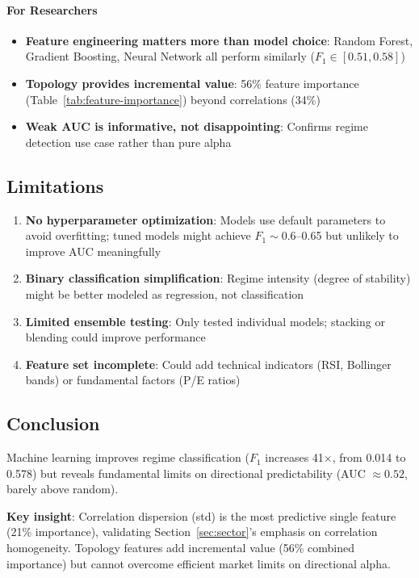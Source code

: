 \paragraph{For Researchers}
\begin{itemize}
    \item \textbf{Feature engineering matters more than model choice}: Random Forest, Gradient Boosting, Neural Network all perform similarly ($F_1 \in [0.51, 0.58]$)
    \item \textbf{Topology provides incremental value}: 56\% feature importance (Table~\ref{tab:feature-importance}) beyond correlations (34\%)
    \item \textbf{Weak AUC is informative, not disappointing}: Confirms regime detection use case rather than pure alpha
\end{itemize}

\subsection{Limitations}

\begin{enumerate}
    \item \textbf{No hyperparameter optimization}: Models use default parameters to avoid overfitting; tuned models might achieve $F_1 \sim 0.6$--0.65 but unlikely to improve AUC meaningfully
    \item \textbf{Binary classification simplification}: Regime intensity (degree of stability) might be better modeled as regression, not classification
    \item \textbf{Limited ensemble testing}: Only tested individual models; stacking or blending could improve performance
    \item \textbf{Feature set incomplete}: Could add technical indicators (RSI, Bollinger bands) or fundamental factors (P/E ratios)
\end{enumerate}

\subsection{Conclusion}

Machine learning improves regime classification ($F_1$ increases 41$\times$, from 0.014 to 0.578) but reveals fundamental limits on directional predictability (AUC $\approx 0.52$, barely above random). \mlguardrail{}

\textbf{Key insight}: Correlation dispersion (std) is the most predictive single feature (21\% importance), validating Section~\ref{sec:sector}'s emphasis on correlation homogeneity. Topology features add incremental value (56\% combined importance) but cannot overcome efficient market limits on directional alpha.

